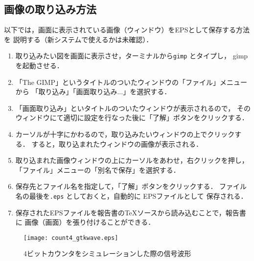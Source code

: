 \documentclass{ujarticle}[11pt]
\begin{document}
    \subsection{画像の取り込み方法}
    \label{subsec:画像の取り込み方法}
    以下では，画面に表示されている画像（ウィンドウ）をEPSとして保存する方法を
    説明する（新システムで使えるかは未確認）．
    \begin{enumerate}
    \item 取り込みたい図を画面に表示させ，ターミナルから{\tt gimp} とタイプし，
    gimp を起動させる．
    \item 「The GIMP」というタイトルのついたウィンドウの「ファイル」メニューから
    「取り込み」「画面取り込み...」を選択する．
    \item 「画面取り込み」といタイトルのついたウィンドウが表示されるので，
    そのウィンドウにて適切に設定を行なった後に「了解」ボタンをクリックする．
    \item カーソルが十字にかわるので，取り込みたいウィンドウの上でクリックする．
    すると，取り込まれたウィンドウの画像が表示される．
    \item 取り込まれた画像ウィンドウの上にカーソルをあわせ，右クリックを押し，
    「ファイル」メニューの「別名で保存」を選択する．
    \item 保存先とファイル名を指定して，「了解」ボタンをクリックする．
    ファイル名の最後を{\tt .eps} としておくと，自動的に EPSファイルとして
    保存される．
    \item 保存されたEPSファイルを報告書のTeXソースから読み込むことで，報告書に
    画像（画面）を張り付けることができる．
    \end{enumerate}
     
     
    \begin{figure}[tb]
    \begin{center}
    \texttt{[image: count4\_gtkwave.eps]}
    \caption{4ビットカウンタをシミュレーションした際の信号波形}
    \label{fig:4ビットカウンタをシミュレーションした際の信号波形}
    \end{center}
    \end{figure}
     
    
\end{document}
